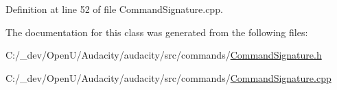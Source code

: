 Definition at line 52 of file Command\+Signature.\+cpp.



The documentation for this class was generated from the following files\+:\begin{DoxyCompactItemize}
\item 
C\+:/\+\_\+dev/\+Open\+U/\+Audacity/audacity/src/commands/\hyperlink{_command_signature_8h}{Command\+Signature.\+h}\item 
C\+:/\+\_\+dev/\+Open\+U/\+Audacity/audacity/src/commands/\hyperlink{_command_signature_8cpp}{Command\+Signature.\+cpp}\end{DoxyCompactItemize}
